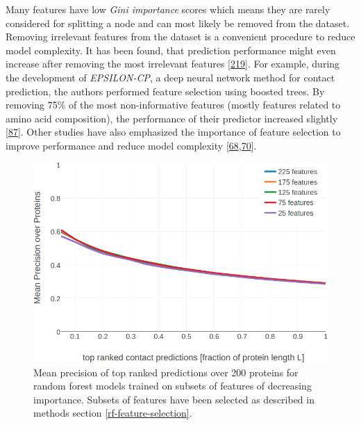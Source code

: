 \documentclass[11pt,a4paper,twoside]{book}
\theoremstyle{definition}
\theoremstyle{definition}
\theoremstyle{remark}
\begin{document}
Many features have low \emph{Gini importance} scores which means they
are rarely considered for splitting a node and can most likely be
removed from the dataset. Removing irrelevant features from the dataset
is a convenient procedure to reduce model complexity. It has been found,
that prediction performance might even increase after removing the most
irrelevant features {[}\protect\hyperlink{ref-Menze2009}{219}{]}. For
example, during the development of \emph{EPSILON-CP}, a deep neural
network method for contact prediction, the authors performed feature
selection using boosted trees. By removing 75\% of the most
non-informative features (mostly features related to amino acid
composition), the performance of their predictor increased slightly
{[}\protect\hyperlink{ref-Stahl2017}{87}{]}. Other studies have also
emphasized the importance of feature selection to improve performance
and reduce model complexity
{[}\protect\hyperlink{ref-Cheng2007}{68},\protect\hyperlink{ref-Li2011}{70}{]}.







\begin{figure}
\includegraphics[width=0.9\linewidth]{img/random_forest_contact_prior/precision_vs_rank_featureselection_random_forest_optimized_hyperparameters} \caption{Mean precision of top
ranked predictions over 200 proteins for random forest models trained on
subsets of features of decreasing importance. Subsets of features have
been selected as described in methods section
\ref{rf-feature-selection}.}\label{fig:rf-feature-selection-performance}
\end{figure}
\end{document}
